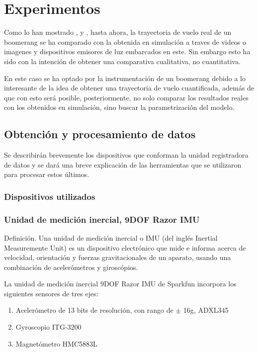\section{Experimentos}


	Como lo han mostrado \cite{Hess1975}, \cite{Azuma} y \cite{Lorenz}, hasta ahora, la trayectoria de vuelo real de un boomerang se ha comparado con la obtenida en simulación a traves de videos o imagenes y dispositivos emisores de luz embarcados en este. Sin embargo esto ha sido con la intención de obtener una comparativa cualitativa, no cuantitativa.

	En este caso se ha optado por la instrumentación de un boomerang debido a lo interesante de la idea de obtener una trayectoria de vuelo cuantificada, además de que con esto será posible, posteriormente, no solo comparar los resultados reales con los obtenidos en simulación, sino buscar la parametrización del modelo.

	\subsection{Obtención y procesamiento de datos}

	Se describirán brevemente los dispositivos que conforman la unidad registradora de datos y se dará una breve explicación de las herramientas que se utilizaron para procesar estos últimos.

	\subsubsection{Dispositivos utilizados}

	\subsubsection{Unidad de medición inercial, 9DOF Razor IMU}

	Definición. Una unidad de medición inercial o IMU (del inglés Inertial Measuremente Unit) es un dispositivo electrónico que mide e informa acerca de velocidad, orientación y fuerzas gravitacionales de un aparato, usando una combinación de acelerómetros y giroscópios.

	La unidad de medición inercial 9DOF Razor IMU de Sparkfun incorpora los siguientes sensores de tres ejes:

	\begin{enumerate}
	\item {Acelerómetro de 13 bits de resolución, con rango de $\pm$ 16g, ADXL345}
	\item{Gyroscopio ITG-3200}
	\item{Magnetómetro HMC5883L}
	\end{enumerate}

